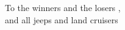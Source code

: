 
\begin{dedication}
\null\vfil
{\large
\begin{center}
To the winners and the
losers ,\\\vspace{12pt}
and all jeeps and land cruisers\\\vspace{12pt}
\end{center}}
\vfil\null
\end{dedication}
